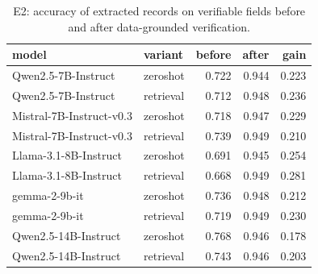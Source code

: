 \begin{table}
\caption{E2: accuracy of extracted records on verifiable fields before and after data-grounded verification.}
\label{tab:T4_verification_repair}
\begin{tabular}{llrrr}
\toprule
model & variant & before & after & gain \\
\midrule
Qwen2.5-7B-Instruct & zeroshot & 0.722 & 0.944 & 0.223 \\
Qwen2.5-7B-Instruct & retrieval & 0.712 & 0.948 & 0.236 \\
Mistral-7B-Instruct-v0.3 & zeroshot & 0.718 & 0.947 & 0.229 \\
Mistral-7B-Instruct-v0.3 & retrieval & 0.739 & 0.949 & 0.210 \\
Llama-3.1-8B-Instruct & zeroshot & 0.691 & 0.945 & 0.254 \\
Llama-3.1-8B-Instruct & retrieval & 0.668 & 0.949 & 0.281 \\
gemma-2-9b-it & zeroshot & 0.736 & 0.948 & 0.212 \\
gemma-2-9b-it & retrieval & 0.719 & 0.949 & 0.230 \\
Qwen2.5-14B-Instruct & zeroshot & 0.768 & 0.946 & 0.178 \\
Qwen2.5-14B-Instruct & retrieval & 0.743 & 0.946 & 0.203 \\
\bottomrule
\end{tabular}
\end{table}
